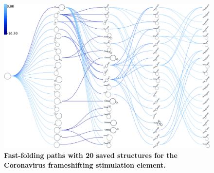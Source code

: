 \documentclass[a4paper,12pt]{article}
\begin{document}
\begin{figure}[htbp]
\centering
\includegraphics[width=.9\linewidth]{img/frame_shift/path_20.png}
\caption{\textbf{Fast-folding paths with 20 saved structures for the Coronavirus frameshifting stimulation element.}}
\end{figure}
\end{document}
